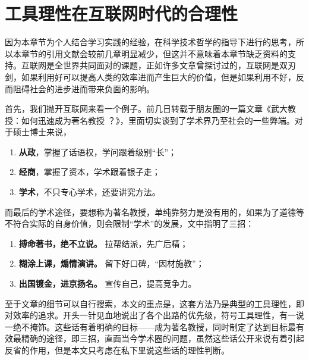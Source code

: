 \section{工具理性在互联网时代的合理性}
因为本章节为个人结合学习实践的经验，在科学技术哲学的指导下进行的思考，所以本章节的引用文献会较前几章明显减少，但这并不意味着本章节缺乏资料的支持。互联网是全世界共同面对的课题，正如许多文章曾探讨过的，互联网是双刃剑，如果利用好可以提高人类的效率进而产生巨大的价值，但是如果利用不好，反而阻碍社会的进步进而带来负面的影响。

首先，我们抛开互联网来看一个例子。前几日转载于朋友圈的一篇文章《武大教授：如何迅速成为著名教授 ？》，里面切实谈到了学术界乃至社会的一些弊端。对于硕士博士来说，
\begin{enumerate}[label=第\chinese*选择：]
    \item \textbf{从政}，掌握了话语权，学问跟着级别“长”；
    \item \textbf{经商}，掌握了资本，学术跟着银子走；
    \item \textbf{学术}，不只专心学术，还要讲究方法。
\end{enumerate}
而最后的学术途径，要想称为著名教授，单纯靠努力是没有用的，如果为了道德等不符合实际的自身价值，则会限制“学术”的发展，文中指明了三招：
\begin{enumerate}[label=〖第\chinese*招〗：]
    \item \textbf{搏命著书，绝不立说。} 拉帮结派，先广后精；
    \item \textbf{糊涂上课，煽情演讲。} 留下好口碑，“因材施教”；
    \item \textbf{出国镀金，进京扬名。} 宣传自己，提高竞争力。
\end{enumerate}

至于文章的细节可以自行搜索，本文的重点是，这套方法乃是典型的工具理性，即对效率的追求。开头一针见血地说出了各个出路的优先级，符号工具理性，有一说一绝不掩饰。这些话有着明确的目标——成为著名教授，同时制定了达到目标最有效最精确的途径，即三招，直面当今学术圈的问题，虽然这些话公开来说有着引起反省的作用，但是本文只考虑在私下里说这些话的理性判断。

